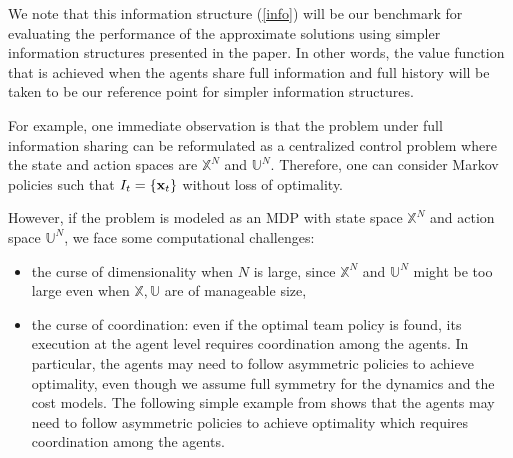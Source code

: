 \documentclass[twoside,11pt]{article}
\begin{document}

We note that this information structure (\ref{info}) will be our benchmark for evaluating the performance of the approximate solutions using simpler information structures presented in the paper. In other words, the value function that is achieved when the agents share full information and full history will be taken to be our reference point for simpler information structures. 

For example, one immediate observation is that the problem under full information sharing can be reformulated as a centralized control problem where the state and action spaces are  $\mathds{X}^N$ and $\mathds{U}^N$. Therefore, one can consider Markov policies such that $I_t=\{{\bf x}_t\}$ without loss of optimality. 

However, if the problem is modeled as an MDP with state space $\mathds{X}^N$ and action space $\mathds{U}^N$, we face some computational challenges:
\begin{itemize}
\item[ (i)] the curse of dimensionality when $N$ is large, since $\mathds{X}^N$ and $\mathds{U}^N$ might be too large even when $\mathds{X,U}$ are of manageable size,
\item[(ii)] the curse of coordination: even if the optimal team policy is found, its execution at the agent level requires coordination among the agents. In particular, the agents may need to follow asymmetric policies to achieve optimality, even though we assume full symmetry for the dynamics and the cost models. 
The following simple example from \cite{bayraktar2023infinite} shows that the agents may need to follow asymmetric policies to achieve optimality which requires coordination among the agents.
\end{itemize}
\end{document}
